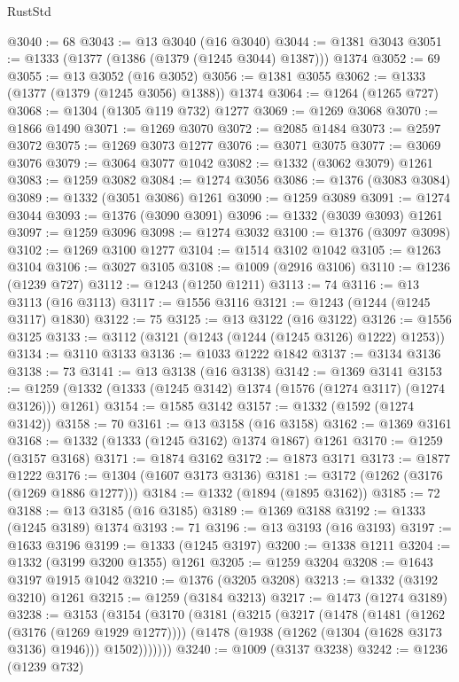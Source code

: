 \begin{lexlean}{RustStd}
\begin{coremodule}
{\begin{coremodule}
{{{{{{{{{{{{{{{{{{{{{{{{{{{{{{{{{{{@3040 := 68
@3043 := @13 @3040 (@16 @3040)
@3044 := @1381 @3043
@3051 := @1333 (@1377 (@1386 (@1379 (@1245 @3044) @1387))) @1374
@3052 := 69
@3055 := @13 @3052 (@16 @3052)
@3056 := @1381 @3055
@3062 := @1333 (@1377 (@1379 (@1245 @3056) @1388)) @1374
@3064 := @1264 (@1265 @727)
@3068 := @1304 (@1305 @119 @732) @1277
@3069 := @1269 @3068
@3070 := @1866 @1490
@3071 := @1269 @3070
@3072 := @2085 @1484
@3073 := @2597 @3072
@3075 := @1269 @3073 @1277
@3076 := @3071 @3075
@3077 := @3069 @3076
@3079 := @3064 @3077 @1042
@3082 := @1332 (@3062 @3079) @1261
@3083 := @1259 @3082
@3084 := @1274 @3056
@3086 := @1376 (@3083 @3084)
@3089 := @1332 (@3051 @3086) @1261
@3090 := @1259 @3089
@3091 := @1274 @3044
@3093 := @1376 (@3090 @3091)
@3096 := @1332 (@3039 @3093) @1261
@3097 := @1259 @3096
@3098 := @1274 @3032
@3100 := @1376 (@3097 @3098)
@3102 := @1269 @3100 @1277
@3104 := @1514 @3102 @1042
@3105 := @1263 @3104
@3106 := @3027 @3105
@3108 := @1009 (@2916 @3106)
@3110 := @1236 (@1239 @727)
@3112 := @1243 (@1250 @1211)
@3113 := 74
@3116 := @13 @3113 (@16 @3113)
@3117 := @1556 @3116
@3121 := @1243 (@1244 (@1245 @3117) @1830)
@3122 := 75
@3125 := @13 @3122 (@16 @3122)
@3126 := @1556 @3125
@3133 := @3112 (@3121 (@1243 (@1244 (@1245 @3126) @1222) @1253))
@3134 := @3110 @3133
@3136 := @1033 @1222 @1842
@3137 := @3134 @3136
@3138 := 73
@3141 := @13 @3138 (@16 @3138)
@3142 := @1369 @3141
@3153 := @1259 (@1332 (@1333 (@1245 @3142) @1374 (@1576 (@1274 @3117) (@1274 @3126))) @1261)
@3154 := @1585 @3142
@3157 := @1332 (@1592 (@1274 @3142))
@3158 := 70
@3161 := @13 @3158 (@16 @3158)
@3162 := @1369 @3161
@3168 := @1332 (@1333 (@1245 @3162) @1374 @1867) @1261
@3170 := @1259 (@3157 @3168)
@3171 := @1874 @3162
@3172 := @1873 @3171
@3173 := @1877 @1222
@3176 := @1304 (@1607 @3173 @3136)
@3181 := @3172 (@1262 (@3176 (@1269 @1886 @1277)))
@3184 := @1332 (@1894 (@1895 @3162))
@3185 := 72
@3188 := @13 @3185 (@16 @3185)
@3189 := @1369 @3188
@3192 := @1333 (@1245 @3189) @1374
@3193 := 71
@3196 := @13 @3193 (@16 @3193)
@3197 := @1633 @3196
@3199 := @1333 (@1245 @3197)
@3200 := @1338 @1211
@3204 := @1332 (@3199 @3200 @1355) @1261
@3205 := @1259 @3204
@3208 := @1643 @3197 @1915 @1042
@3210 := @1376 (@3205 @3208)
@3213 := @1332 (@3192 @3210) @1261
@3215 := @1259 (@3184 @3213)
@3217 := @1473 (@1274 @3189)
@3238 := @3153
    (@3154
      (@3170
        (@3181
          (@3215
            (@3217
              (@1478
                (@1481 (@1262 (@3176 (@1269 @1929 @1277))))
                (@1478 (@1938 (@1262 (@1304 (@1628 @3173 @3136) @1946))) @1502)))))))
@3240 := @1009 (@3137 @3238)
@3242 := @1236 (@1239 @732)
}}}}}}}}}}}}}}}}}}}}}}}}}}}}}}}}}}}
\end{coremodule}}
\end{coremodule}
\end{lexlean}
